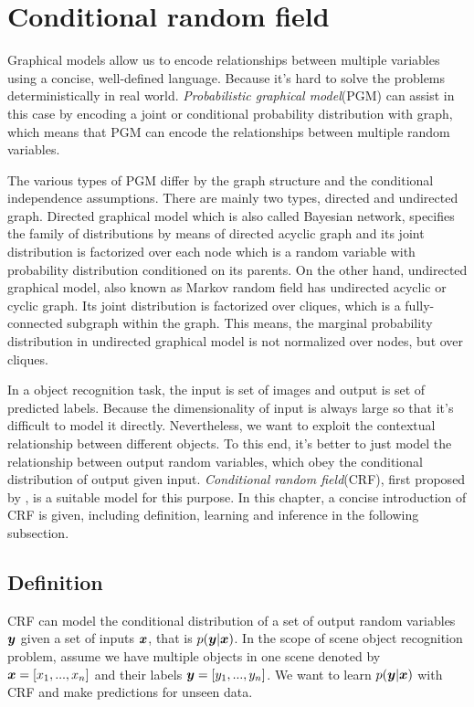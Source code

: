 
\chapter{Conditional random field}
Graphical models allow us to encode relationships between multiple variables using a concise, well-defined language. Because it's hard to solve the problems deterministically in real world. \textit{Probabilistic graphical model}(PGM)\cite{koller2009probabilistic} can assist in this case by encoding a joint or conditional probability distribution with graph, which means that PGM can encode the relationships between multiple random variables. 

The various types of PGM differ by the graph structure and the conditional independence assumptions. There are mainly two types, directed and undirected graph. Directed graphical model which is also called Bayesian network, specifies the family of distributions by means of directed acyclic graph and its joint distribution is factorized over each node which is a random variable with probability distribution conditioned on its parents. On the other hand, undirected graphical model, also known as Markov random field has undirected acyclic or cyclic graph. Its joint distribution is factorized over cliques, which is a fully-connected subgraph within the graph. This means, the marginal probability distribution in undirected graphical model is not normalized over nodes, but over cliques. 

In a object recognition task, the input is set of images and output is set of predicted labels. Because the dimensionality of input is always large so that it's difficult to model it directly. Nevertheless, we want to exploit the contextual relationship between different objects. To this end, it's better to just model the relationship between output random variables, which obey the conditional distribution of output given input. \textit{Conditional random field}(CRF), first proposed by \cite{lafferty2001conditional}, is a suitable model for this purpose. In this chapter, a concise introduction of CRF is given, including definition, learning and inference in the following subsection.
 
\section{Definition}
CRF can model the conditional distribution of a set of output random variables $\boldsymbol y$ given a set of inputs $\boldsymbol x$, that is $p(\boldsymbol y | \boldsymbol x)$. In the scope of scene object recognition problem, assume we have multiple objects in one scene denoted by $\boldsymbol x = [x_1, ..., x_n]$ and their labels $\boldsymbol y = [y_1, ..., y_n]$. We want to learn $p(\boldsymbol y | \boldsymbol x)$ with CRF and make predictions for unseen data.  

